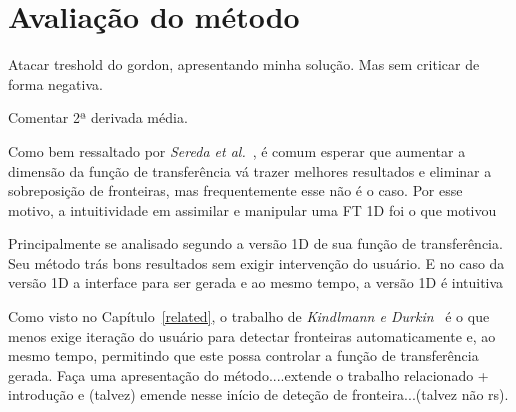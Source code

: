 \section{Avaliação do método}
\label{gordon.aval}    
    Atacar treshold do gordon, apresentando minha solução. Mas sem criticar de forma negativa.
    
    Comentar 2ª derivada média.
    
    Como bem ressaltado por \textit{Sereda et al.}~\cite{sereda1}, é comum esperar que aumentar a dimensão da função de transferência vá trazer melhores resultados e eliminar a sobreposição de fronteiras, mas frequentemente esse não é o caso. Por esse motivo, a intuitividade em assimilar e manipular uma FT 1D foi o que motivou
    
    
    Principalmente se analisado segundo a versão 1D de sua função de transferência. Seu método trás bons resultados sem exigir intervenção do usuário. E no caso da versão 1D a interface para ser gerada e ao mesmo tempo, a versão 1D é intuitiva
    
    
    Como visto no Capítulo~\ref{related}, o trabalho de \textit{Kindlmann e Durkin}~\cite{gordon} é o que menos exige iteração do usuário para detectar fronteiras automaticamente e, ao mesmo tempo, permitindo que este possa controlar a função de transferência gerada.
    Faça uma apresentação do método....extende o trabalho relacionado + introdução e (talvez) emende nesse início de deteção de fronteira...(talvez não rs).